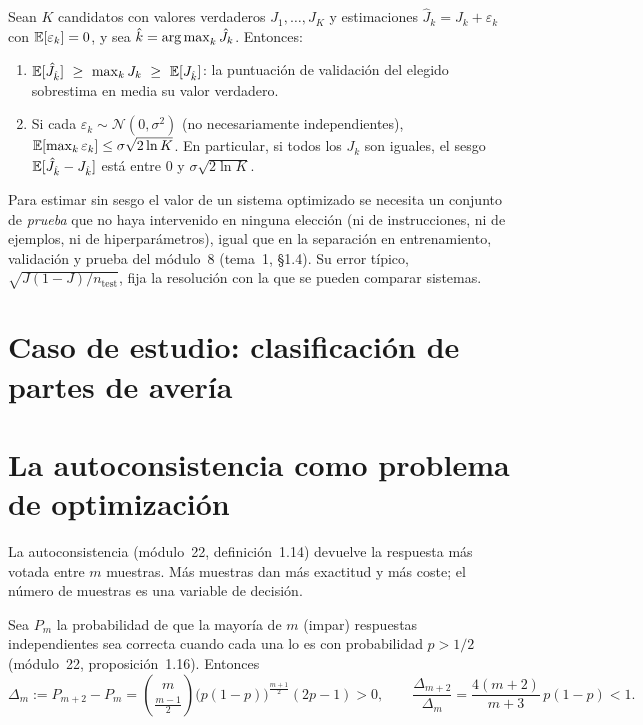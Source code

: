 \begin{proposicion}\label{prop:maldicion}
Sean $K$ candidatos con valores verdaderos $J_1,\dots,J_K$ y estimaciones $\hat J_k=J_k+\varepsilon_k$ con $\mathbb{E}[\varepsilon_k]=0$, y sea $\hat k=\operatorname*{arg\,max}_k\hat J_k$. Entonces:
\begin{enumerate}
  \item $\E[\hat J_{\hat k}]\ \ge\ \max_k J_k\ \ge\ \E[J_{\hat k}]$: la puntuación de validación del elegido sobrestima en media su valor verdadero.
  \item Si cada $\varepsilon_k\sim\mathcal{N}(0,\sigma^{2})$ (no necesariamente independientes), $\mathbb{E}[\max_k\varepsilon_k]\le\sigma\sqrt{2\ln K}$. En particular, si todos los $J_k$ son iguales, el sesgo $\mathbb{E}[\hat J_{\hat k}-J_{\hat k}]$ está entre $0$ y $\sigma\sqrt{2\ln K}$.
\end{enumerate}
\end{proposicion}

\addtocounter{definicion}{1}%

\begin{corolario}\label{cor:protocolo}
Para estimar sin sesgo el valor de un sistema optimizado se necesita un conjunto de \emph{prueba} que no haya intervenido en ninguna elección (ni de instrucciones, ni de ejemplos, ni de hiperparámetros), igual que en la separación en entrenamiento, validación y prueba del módulo~8 (tema~1, §1.4). Su error típico, $\sqrt{J(1-J)/n_{\mathrm{test}}}$, fija la resolución con la que se pueden comparar sistemas.
\end{corolario}

\section{Caso de estudio: clasificación de partes de avería}

\addtocounter{definicion}{1}%

\section{La autoconsistencia como problema de optimización}

La autoconsistencia (módulo~22, definición~1.14) devuelve la respuesta más votada entre $m$ muestras. Más muestras dan más exactitud y más coste; el número de muestras es una variable de decisión.

\begin{proposicion}\label{prop:incremento}
Sea $P_m$ la probabilidad de que la mayoría de $m$ (impar) respuestas independientes sea correcta cuando cada una lo es con probabilidad $p>1/2$ (módulo~22, proposición~1.16). Entonces
\[
\Delta_m:=P_{m+2}-P_m=\binom{m}{\frac{m-1}{2}}\bigl(p(1-p)\bigr)^{\frac{m+1}{2}}(2p-1)>0,\qquad \frac{\Delta_{m+2}}{\Delta_m}=\frac{4(m+2)}{m+3}\,p(1-p)<1 .
\]
\end{proposicion}

